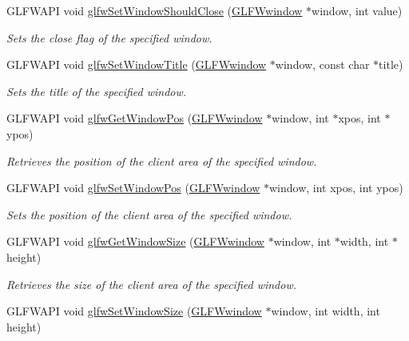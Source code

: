 \begin{DoxyCompactItemize}
\-G\-L\-F\-W\-A\-P\-I void \hyperlink{group__window_ga1cadeda7a1e2f224e06a8415d30741aa}{glfw\-Set\-Window\-Should\-Close} (\hyperlink{group__window_ga3c96d80d363e67d13a41b5d1821f3242}{\-G\-L\-F\-Wwindow} $\ast$window, int value)
\begin{DoxyCompactList}\small\item\em \-Sets the close flag of the specified window. \end{DoxyCompactList}\item 
\-G\-L\-F\-W\-A\-P\-I void \hyperlink{group__window_ga861ed3414ab8120e2f74151a666ed1dc}{glfw\-Set\-Window\-Title} (\hyperlink{group__window_ga3c96d80d363e67d13a41b5d1821f3242}{\-G\-L\-F\-Wwindow} $\ast$window, const char $\ast$title)
\begin{DoxyCompactList}\small\item\em \-Sets the title of the specified window. \end{DoxyCompactList}\item 
\-G\-L\-F\-W\-A\-P\-I void \hyperlink{group__window_ga0076a8591ef7494d359730cf2250b45b}{glfw\-Get\-Window\-Pos} (\hyperlink{group__window_ga3c96d80d363e67d13a41b5d1821f3242}{\-G\-L\-F\-Wwindow} $\ast$window, int $\ast$xpos, int $\ast$ypos)
\begin{DoxyCompactList}\small\item\em \-Retrieves the position of the client area of the specified window. \end{DoxyCompactList}\item 
\-G\-L\-F\-W\-A\-P\-I void \hyperlink{group__window_ga0dc8d880a0d87be16d3ea8114561f6f0}{glfw\-Set\-Window\-Pos} (\hyperlink{group__window_ga3c96d80d363e67d13a41b5d1821f3242}{\-G\-L\-F\-Wwindow} $\ast$window, int xpos, int ypos)
\begin{DoxyCompactList}\small\item\em \-Sets the position of the client area of the specified window. \end{DoxyCompactList}\item 
\-G\-L\-F\-W\-A\-P\-I void \hyperlink{group__window_ga7feb769ebb3f3d21579b5a3fb07be76e}{glfw\-Get\-Window\-Size} (\hyperlink{group__window_ga3c96d80d363e67d13a41b5d1821f3242}{\-G\-L\-F\-Wwindow} $\ast$window, int $\ast$width, int $\ast$height)
\begin{DoxyCompactList}\small\item\em \-Retrieves the size of the client area of the specified window. \end{DoxyCompactList}\item 
\-G\-L\-F\-W\-A\-P\-I void \hyperlink{group__window_gae54d1f4915ded15e267ddd3f41496cd2}{glfw\-Set\-Window\-Size} (\hyperlink{group__window_ga3c96d80d363e67d13a41b5d1821f3242}{\-G\-L\-F\-Wwindow} $\ast$window, int width, int height)

\end{DoxyCompactItemize}
